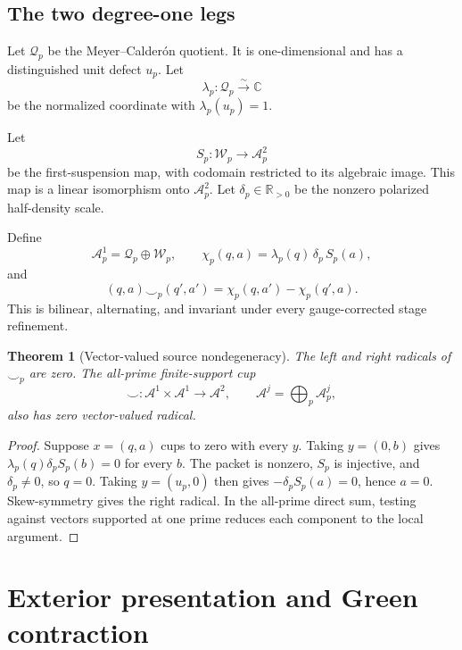 \documentclass[11pt]{article}
\newtheorem{theorem}{Theorem}[section]
\theoremstyle{definition}
\theoremstyle{remark}
\newcommand{\C}{\mathbb C}
\newcommand{\R}{\mathbb R}
\newcommand{\cA}{\mathcal A}
\newcommand{\cQ}{\mathcal Q}
\newcommand{\cW}{\mathcal W}
\begin{document}
\subsection{The two degree-one legs}

Let \(\cQ_p\) be the Meyer--Calder\'on quotient.  It is one-dimensional
and has a distinguished unit defect \(u_p\).  Let
\[
                        \lambda_p:\cQ_p\overset{\sim}{\longrightarrow}\C
\tag{2.4}\label{eq:calderon-coordinate}
\]
be the normalized coordinate with \(\lambda_p(u_p)=1\).

Let
\[
                         S_p:\cW_p\longrightarrow \cA_p^2
\tag{2.5}\label{eq:first-suspension}
\]
be the first-suspension map, with codomain restricted to its algebraic
image.  This map is a linear isomorphism onto \(\cA_p^2\).  Let
\(\delta_p\in\R_{>0}\) be the nonzero polarized half-density scale.

Define
\[
   \cA_p^1=\cQ_p\oplus\cW_p,\qquad
   \chi_p(q,a)=\lambda_p(q)\,\delta_p\,S_p(a),
\tag{2.6}\label{eq:two-step-source}
\]
and
\[
  (q,a)\smile_p(q',a')
    =\chi_p(q,a')-\chi_p(q',a).
\tag{2.7}\label{eq:local-cup}
\]
This is bilinear, alternating, and invariant under every
gauge-corrected stage refinement.

\begin{theorem}[Vector-valued source nondegeneracy]
\label{thm:vector-source-nondegenerate}
The left and right radicals of \(\smile_p\) are zero.  The all-prime
finite-support cup
\[
  \smile:\cA^1\times\cA^1\longrightarrow\cA^2,\qquad
  \cA^j=\bigoplus_p\cA_p^j,
\tag{2.8}\label{eq:global-cup}
\]
also has zero vector-valued radical.
\end{theorem}

\begin{proof}
Suppose \(x=(q,a)\) cups to zero with every \(y\).
Taking \(y=(0,b)\) gives
\(\lambda_p(q)\delta_pS_p(b)=0\) for every \(b\).
The packet is nonzero, \(S_p\) is injective, and \(\delta_p\ne0\), so
\(q=0\).  Taking \(y=(u_p,0)\) then gives
\(-\delta_pS_p(a)=0\), hence \(a=0\).  Skew-symmetry gives the right
radical.  In the all-prime direct sum, testing against vectors supported at
one prime reduces each component to the local argument.
\end{proof}

\section{Exterior presentation and Green contraction}
\label{sec:milnor}
\end{document}
